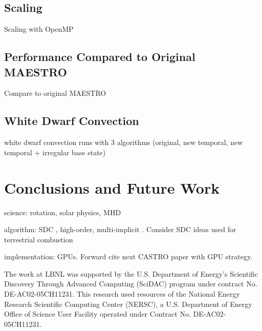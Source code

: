 \documentclass{aastex62}
\begin{document}
\subsection{Scaling}
Scaling with OpenMP

\subsection{Performance Compared to Original MAESTRO}
Compare to original MAESTRO

\subsection{White Dwarf Convection}
white dwarf convection runs with 3 algorithms (original, new temporal, new temporal + irregular base state)

\section{Conclusions and Future Work}

science: rotation, solar physics, MHD

algorithm: SDC \cite{dutt2000spectral}, high-order, multi-implicit \cite{bourlioux2003high}.
Consider SDC ideas used for terrestrial combustion \cite{pazner2016high,nonaka2018conservative}

implementation: GPUs.  Forward cite next CASTRO paper with GPU strategy.

\acknowledgements

The work at LBNL was supported by the U.S. Department of Energy's Scientific Discovery Through Advanced Computing (SciDAC) program under contract No. DE-AC02-05CH11231.
This research used resources of the National Energy Research Scientific Computing Center (NERSC), a U.S. Department of Energy Office of Science User Facility operated under Contract No. DE-AC02-05CH11231.



\end{document}

